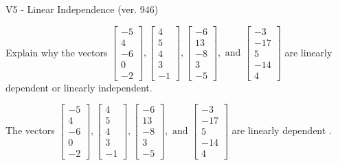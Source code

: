 \begin{exercise}
  \begin{exerciseTitle}V5 - Linear Independence (ver. 946)\end{exerciseTitle}
  \begin{exerciseStatement}
    Explain why the vectors \(\left[\begin{array}{r}
-5 \\
4 \\
-6 \\
0 \\
-2
\end{array}\right] , \left[\begin{array}{r}
4 \\
5 \\
4 \\
3 \\
-1
\end{array}\right] , \left[\begin{array}{r}
-6 \\
13 \\
-8 \\
3 \\
-5
\end{array}\right] , \text{ and } \left[\begin{array}{r}
-3 \\
-17 \\
5 \\
-14 \\
4
\end{array}\right]\) are linearly dependent or linearly independent.	


  \end{exerciseStatement}
  \begin{exerciseAnswer}
   The vectors \(\left[\begin{array}{r}
-5 \\
4 \\
-6 \\
0 \\
-2
\end{array}\right] , \left[\begin{array}{r}
4 \\
5 \\
4 \\
3 \\
-1
\end{array}\right] , \left[\begin{array}{r}
-6 \\
13 \\
-8 \\
3 \\
-5
\end{array}\right] , \text{ and } \left[\begin{array}{r}
-3 \\
-17 \\
5 \\
-14 \\
4
\end{array}\right]\) are 
  	 linearly dependent  .
  


  \end{exerciseAnswer}
\end{exercise}